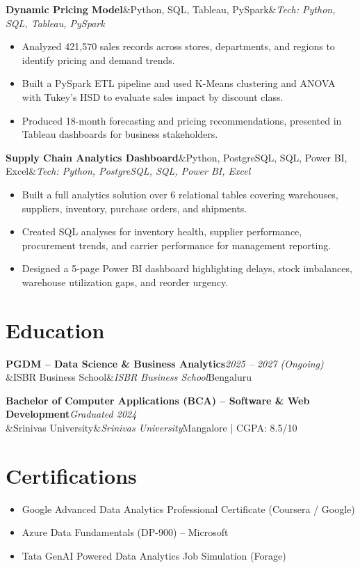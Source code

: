 \documentclass[a4paper,10pt]{article}
\newcommand{\entry}[4]{%
  \noindent\textbf{#1}\hfill\textit{#2}\\
  \ifx&#3&\else\textit{#3}\hfill\textcolor{muted}{#4}\fi\par
  \vspace{1pt}}
\newcommand{\projtitle}[2]{%
  \noindent\textbf{#1}\ifx&#2&\else\quad\textcolor{muted}{\small\textit{Tech: #2}}\fi\par}
\begin{document}
\projtitle{Dynamic Pricing Model}{Python, SQL, Tableau, PySpark}
\begin{itemize}
  \item Analyzed 421,570 sales records across stores, departments, and regions to identify pricing and demand trends.
  \item Built a PySpark ETL pipeline and used K-Means clustering and ANOVA with Tukey's HSD to evaluate sales impact by discount class.
  \item Produced 18-month forecasting and pricing recommendations, presented in Tableau dashboards for business stakeholders.
\end{itemize}
\vspace{2pt}

\projtitle{Supply Chain Analytics Dashboard}{Python, PostgreSQL, SQL, Power BI, Excel}
\begin{itemize}
  \item Built a full analytics solution over 6 relational tables covering warehouses, suppliers, inventory, purchase orders, and shipments.
  \item Created SQL analyses for inventory health, supplier performance, procurement trends, and carrier performance for management reporting.
  \item Designed a 5-page Power BI dashboard highlighting delays, stock imbalances, warehouse utilization gaps, and reorder urgency.
\end{itemize}

\section*{Education}
\entry{PGDM -- Data Science \& Business Analytics}{2025 -- 2027 (Ongoing)}{ISBR Business School}{Bengaluru}
\vspace{1pt}
\entry{Bachelor of Computer Applications (BCA) -- Software \& Web Development}{Graduated 2024}{Srinivas University}{Mangalore | CGPA: 8.5/10}

\section*{Certifications}
\begin{itemize}
  \item Google Advanced Data Analytics Professional Certificate (Coursera / Google)
  \item Azure Data Fundamentals (DP-900) -- Microsoft
  \item Tata GenAI Powered Data Analytics Job Simulation (Forage)
\end{itemize}
\end{document}
